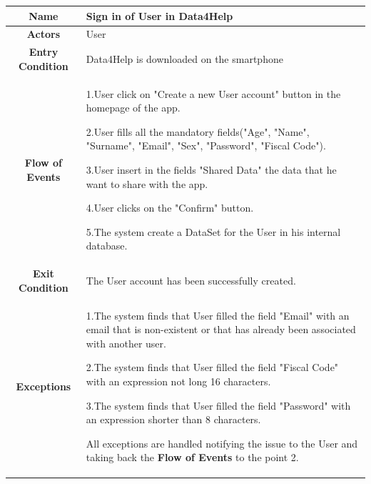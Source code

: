       \begin{table}[h!]
        \centering
        \begin{tabularx}{\linewidth}{|c|X|}
          \hline
          \textbf{Name} & Sign in of User in Data4Help\\
        	\hline
        	\textbf{Actors} & User \\
        	\hline
        	\textbf{Entry Condition} & Data4Help is downloaded on the smartphone \\
        	\hline
        	\textbf{Flow of Events} & 1.User click on "Create a new User account" button in the homepage of the app.

        					2.User fills all the mandatory fields("Age", "Name", "Surname", "Email", "Sex", "Password", "Fiscal 							Code").

        					3.User insert in the fields "Shared Data" the data that he want to share with the app.

        					4.User clicks on the "Confirm" button.

        					5.The system create a DataSet for the User in his internal database.\\
        	\hline
        	\textbf{Exit Condition} & The User account has been successfully created. \\
        	\hline
        	\textbf{Exceptions} &
        					1.The system finds that User filled the field "Email"  with an email that is non-existent or that has 							already been associated with another user.

        					2.The system finds that User filled the field "Fiscal Code" with an expression not long 16 								characters.

        					3.The system finds that User filled the field "Password" with an expression shorter than 8 								characters.

        					All exceptions are handled notifying the issue to the User and taking back the \textbf{Flow of 							Events} to the point 2.\\
          \hline
        \end{tabularx}
      \end{table}

